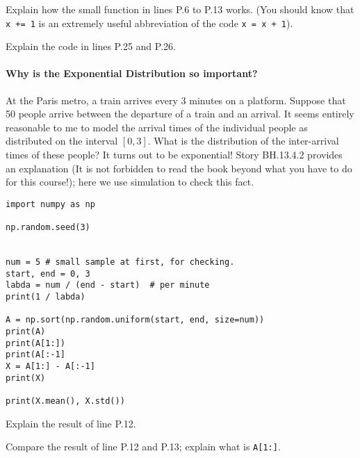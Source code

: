 \documentclass[assignments]{subfiles}
\begin{document}
\begin{exercise}
Explain how the small function in lines P.6 to P.13 works.
(You should know that \texttt{x += 1} is an extremely useful abbreviation of the code \texttt{x = x + 1}).
\begin{solution}
\end{solution}
\end{exercise}

\begin{exercise}
Explain the code in lines P.25 and P.26.
\begin{solution}
\end{solution}
\end{exercise}

\paragraph{Why is the Exponential Distribution so important?}

At the Paris metro, a train arrives every 3 minutes on a platform.
Suppose that 50 people arrive between the departure of a train and an arrival.
It seems entirely reasonable to me to model the arrival times of the individual people as distributed on the interval \([0,3]\).
What is the distribution of the inter-arrival times of these people?
It turns out to be exponential!
Story BH.13.4.2 provides an explanation (It is not forbidden to read the book beyond what you have to do for this course!); here we use simulation to check this fact.



\begin{verbatim}
import numpy as np

np.random.seed(3)


num = 5 # small sample at first, for checking.
start, end = 0, 3
labda = num / (end - start)  # per minute
print(1 / labda)

A = np.sort(np.random.uniform(start, end, size=num))
print(A)
print(A[1:])
print(A[:-1]
X = A[1:] - A[:-1]
print(X)

print(X.mean(), X.std())
\end{verbatim}

\begin{exercise}
Explain the result of line P.12.
\begin{solution}
\end{solution}
\end{exercise}

\begin{exercise}
Compare the result of  line P.12 and P.13;  explain what is \texttt{A[1:]}.
\begin{solution}
\end{solution}
\end{exercise}
\end{document}

